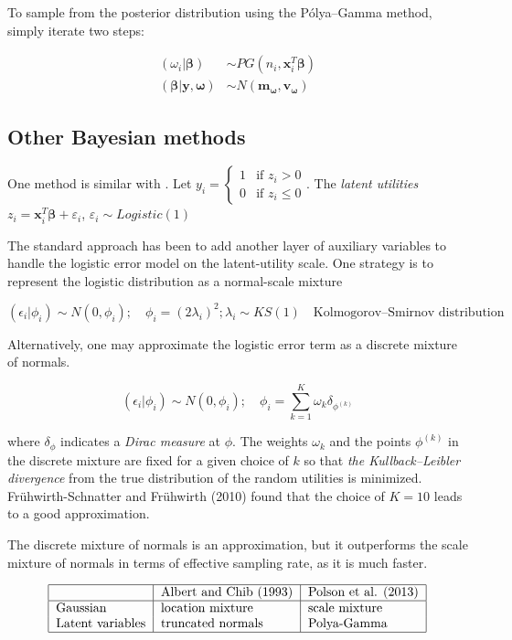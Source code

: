 \documentclass[12pt]{article}
\begin{document}
To sample from the posterior distribution using the Pólya--Gamma method,
simply iterate two steps:

\[\begin{aligned}
(\omega_i|\boldsymbol{\beta})&\sim PG(n_i,\mathbf{x}_i^T\boldsymbol{\beta})\\
(\boldsymbol{\beta|y,\omega})&\sim N(\mathbf{m_\omega,v_\omega})
\end{aligned}\]

\hypertarget{other-bayesian-methods}{%
\subsection{Other Bayesian methods}\label{other-bayesian-methods}}

One method is similar with \citet{albertBayesianAnalysisBinary1993}. Let
\(y_i=\begin{cases}1&\text{if } z_i>0\\0&\text{if }z_i\le0\end{cases}\).
The \emph{latent utilities}
\(z_i=\mathbf{x}_i^T\boldsymbol{\beta}+\varepsilon_i\),
\(\varepsilon_i\sim Logistic(1)\)

The standard approach has been to add another layer of auxiliary
variables to handle the logistic error model on the latent-utility
scale. One strategy is to represent the logistic distribution as a
normal-scale mixture

\[(\epsilon_i|\phi_i)\sim N(0,\phi_i);\quad \phi_i=(2\lambda_i)^2; \lambda_i\sim KS(1)\quad\text{Kolmogorov–Smirnov distribution}\]

Alternatively, one may approximate the logistic error term as a discrete
mixture of normals.

\[(\epsilon_i|\phi_i)\sim N(0,\phi_i);\quad \phi_i=\sum_{k=1}^K\omega_k\delta_{\phi^{(k)}}\]

where \(\delta_{\phi}\) indicates a {\emph{Dirac measure}} at \(\phi\).
The weights \(\omega_k\) and the points \(\phi^{(k)}\) in the discrete
mixture are fixed for a given choice of \(k\) so that \emph{{the
Kullback--Leibler divergence}} from the true distribution of the random
utilities is minimized. Frühwirth-Schnatter and Frühwirth (2010) found
that the choice of \(K=10\) leads to a good approximation.

The discrete mixture of normals is an approximation, but it outperforms
the scale mixture of normals in terms of effective sampling rate, as it
is much faster.

\[\begin{tabular}{|l|l|l|}\hline
                 & {Albert and Chib (1993)} & Polson et al. (2013) \\\hline
{Gaussian}         & location mixture  & scale mixture \\
{Latent variables} & truncated normals & Polya-Gamma \\\hline
\end{tabular}\]
\end{document}
